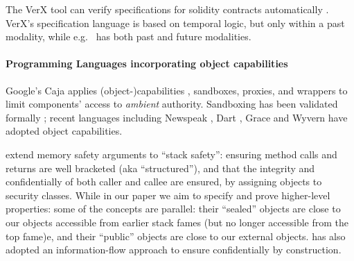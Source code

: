 The VerX tool can verify
specifications for solidity contracts automatically \cite{VerX}.
VerX's specification language is based on
temporal logic, 
but only within a past modality, while e.g.\ \citet{OOPSLA22} has both past
and future modalities.






\paragraph{Programming Languages incorporating object capabilities}
Google's Caja \cite{Caja} applies (object-)capabilities \cite{Dennis66,JamesMorris,MillerPhD}, 
sandboxes, proxies, and wrappers to limit components'
access to \textit{ambient} authority.
Sandboxing has been validated
formally %
\cite{mmt-oakland10};
recent languages %
\cite{CapJavaHayesAPLAS17,CapNetSocc17Eide,DOCaT14} including Newspeak
\cite{newspeak17}, Dart \cite{dart15}, Grace \cite{grace,graceClasses}
and Wyvern \cite{wyverncapabilities}
have adopted
object
capabilities.






\citet{stack-safety-csf2023} extend memory safety arguments to ``stack
safety'': ensuring method calls and returns are well bracketed (aka
``structured''), and that the integrity and confidentially of both
caller and callee are ensured, by assigning objects to security
classes. While in our paper we aim to specify and prove higher-level
properties: some of the concepts are parallel: their ``sealed''
objects are close to our objects accessible from earlier stack fames
(but no longer accessible from the top fame)e, and their ``public''
objects are close to our external objects.
%
%
\citet{schaeferCbC} has also adopted
an information-flow approach to ensure confidentially by construction.

 





